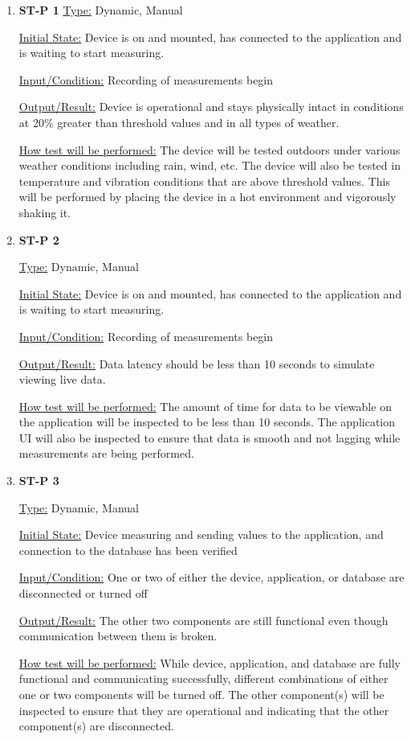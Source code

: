 \documentclass[12pt, titlepage]{article}
\begin{document}
\begin{enumerate}

\item{\bf{ST-P 1}}
\underline{Type:} Dynamic, Manual
					
\underline{Initial State:} Device is on and mounted, has connected to the application and is waiting to start measuring.
					
\underline{Input/Condition:} Recording of measurements begin
					
\underline{Output/Result:} Device is operational and stays physically intact in conditions at 20\% greater than threshold values and in all types of weather.
					
\underline{How test will be performed:} The device will be tested outdoors under various weather conditions including rain, wind, etc.
The device will also be tested in temperature and vibration conditions that are above threshold values. This will be performed by placing the device in a hot environment
and vigorously shaking it.
					
\newpage
\item{\bf{ST-P 2}}

\underline{Type:} Dynamic, Manual
					
\underline{Initial State:} Device is on and mounted, has connected to the application and is waiting to start measuring.
					
\underline{Input/Condition:} Recording of measurements begin
					
\underline{Output/Result:} Data latency should be less than 10 seconds to simulate viewing live data.
					
\underline{How test will be performed:} The amount of time for data to be viewable on the application will be inspected to be less than 10 seconds.
The application UI will also be inspected to ensure that data is smooth and not lagging while measurements are being performed.

\item{\bf{ST-P 3}}

\underline{Type:} Dynamic, Manual
					
\underline{Initial State:} Device measuring and sending values to the application, and connection to the database has been verified
					
\underline{Input/Condition:} One or two of either the device, application, or database are disconnected or turned off
					
\underline{Output/Result:} The other two components are still functional even though communication between them is broken.
					
\underline{How test will be performed:} While device, application, and database are fully functional and communicating successfully, different combinations of either one or two components
will be turned off. The other component(s) will be inspected to ensure that they are operational and indicating that the other component(s) are disconnected.

\end{enumerate}
\newpage
\end{document}
